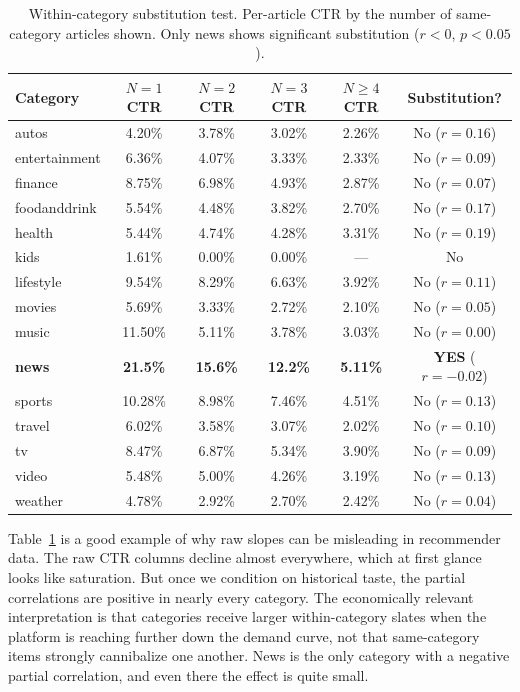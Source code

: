 \documentclass[11pt]{article}
\begin{document}
\begin{table}[ht]
\centering
\caption{Within-category substitution test. Per-article CTR by the number of same-category articles shown. Only news shows significant substitution ($r < 0$, $p < 0.05$).}
\label{tab:substitution}
\small
\begin{tabular}{lccccc}
\toprule
Category & $N{=}1$ CTR & $N{=}2$ CTR & $N{=}3$ CTR & $N{\geq}4$ CTR & Substitution? \\
\midrule
autos & 4.20\% & 3.78\% & 3.02\% & 2.26\% & No ($r{=}0.16$) \\
entertainment & 6.36\% & 4.07\% & 3.33\% & 2.33\% & No ($r{=}0.09$) \\
finance & 8.75\% & 6.98\% & 4.93\% & 2.87\% & No ($r{=}0.07$) \\
foodanddrink & 5.54\% & 4.48\% & 3.82\% & 2.70\% & No ($r{=}0.17$) \\
health & 5.44\% & 4.74\% & 4.28\% & 3.31\% & No ($r{=}0.19$) \\
kids & 1.61\% & 0.00\% & 0.00\% & --- & No \\
lifestyle & 9.54\% & 8.29\% & 6.63\% & 3.92\% & No ($r{=}0.11$) \\
movies & 5.69\% & 3.33\% & 2.72\% & 2.10\% & No ($r{=}0.05$) \\
music & 11.50\% & 5.11\% & 3.78\% & 3.03\% & No ($r{=}0.00$) \\
\textbf{news} & \textbf{21.5\%} & \textbf{15.6\%} & \textbf{12.2\%} & \textbf{5.11\%} & \textbf{YES} ($r{=}{-}0.02$) \\
sports & 10.28\% & 8.98\% & 7.46\% & 4.51\% & No ($r{=}0.13$) \\
travel & 6.02\% & 3.58\% & 3.07\% & 2.02\% & No ($r{=}0.10$) \\
tv & 8.47\% & 6.87\% & 5.34\% & 3.90\% & No ($r{=}0.09$) \\
video & 5.48\% & 5.00\% & 4.26\% & 3.19\% & No ($r{=}0.13$) \\
weather & 4.78\% & 2.92\% & 2.70\% & 2.42\% & No ($r{=}0.04$) \\
\bottomrule
\end{tabular}
\end{table}
\FloatBarrier

Table~\ref{tab:substitution} is a good example of why raw slopes can be misleading in recommender data. The raw CTR columns decline almost everywhere, which at first glance looks like saturation. But once we condition on historical taste, the partial correlations are positive in nearly every category. The economically relevant interpretation is that categories receive larger within-category slates when the platform is reaching further down the demand curve, not that same-category items strongly cannibalize one another. News is the only category with a negative partial correlation, and even there the effect is quite small.
\end{document}
